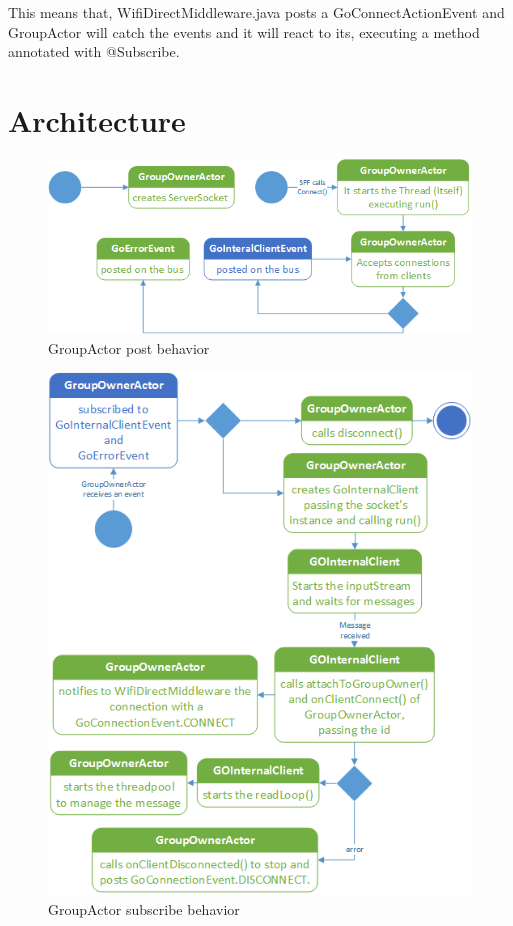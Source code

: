This means that, \textsf{WifiDirectMiddleware.java} posts a \textsf{GoConnectActionEvent} and \textsf{GroupActor} will catch the events and it will react to its, executing a method annotated with \textsf{@Subscribe}.

\section{Architecture}

\begin{figure}[thpb]
	\centering
	\includegraphics[scale=0.5]{./images/chap2/uml-parte0-2.png}
	\caption{GroupActor post behavior}
	\label{uml-part0-2}
\end{figure}	

\begin{figure}[thpb]
	\centering
	\includegraphics[scale=0.6]{./images/chap2/uml-parte0-3.png}
	\caption{GroupActor subscribe behavior}
	\label{uml-part0-3}
\end{figure}	

